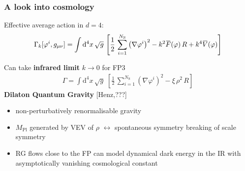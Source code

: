 \documentclass[]{beamer}  %
\newcommand\NS{ N_{\scriptscriptstyle{\mathrm{S}}} }
\newcommand\MPl{ M_{\scriptscriptstyle{\mathrm{Pl}}}{} }
\newcommand{\overbar}[1]{\mkern 1.5mu\overline{\mkern-1.5mu#1\mkern-1.5mu}\mkern 1.5mu}
\begin{document}
\begin{frame}
  \frametitle{A look into cosmology}

  Effective average action in $d=4$:
  \begin{align*}
      \Gamma_k [\varphi^i, g_{\mu\nu}] =
      \int \mathrm d^4x \, \sqrt{g} \,
      \left[
          \frac{1}{2} \, \sum_{i=1}^{\NS} \left( \nabla\varphi^i \right)^2
        - k^2 \overbar F(\varphi) \, R
        + k^4 \overbar V(\varphi)
      \right]
  \end{align*}

  Can take \textbf{infrared limit} $k \rightarrow 0$ for FP3
  \begin{align*}
    \boxed{
      \Gamma = \int \mathrm{d}^4x \, \sqrt{g} \;
      \left[
        \frac{1}{2} \, \sum_{i=1}^{\NS} \left( \nabla\varphi^i \right)^2
        - \xi \, \rho^2 \, R
      \right]
    }
  \end{align*}
  \hfill \textbf{Dilaton Quantum Gravity} {\color{red} [Henz,???]}

  \vspace{10pt}
  \begin{itemize}
    \item non-perturbatively renormalisable gravity\\[5pt]
    \item $\MPl$ generated by VEV of $\rho$ $\leftrightarrow$ spontaneous symmetry breaking of scale symmetry\\[5pt]
    \item RG flows close to the FP can model dynamical dark energy in the IR
      with asymptotically vanishing cosmological constant %
  \end{itemize}

\end{frame}


\end{document}
